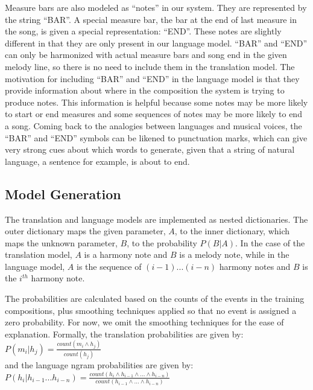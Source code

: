\documentclass{sig-alternate}
\begin{document}
Measure bars are also modeled as ``notes'' in our system. They are represented by the string ``BAR''. A special measure bar, the bar at the end of last measure in the song, is given a special representation: ``END''. These notes are slightly different in that they are only present in our language model. ``BAR'' and ``END'' can only be harmonized with actual measure bars and song end in the given melody line, so there is no need to include them in the translation model. The motivation for including ``BAR'' and ``END'' in the language model is that they provide information about where in the composition the system is trying to produce notes. This information is helpful because some notes may be more likely to start or end measures and some sequences of notes may be more likely to end a song. Coming back to the analogies between languages and musical voices, the ``BAR'' and ``END'' symbols can be likened to punctuation marks, which can give very strong cues about which words to generate, given that a string of natural language, a sentence for example, is about to end.

\subsection{Model Generation}
The translation and language models are implemented as nested dictionaries. The outer dictionary maps the given parameter, $A$, to the inner dictionary, which maps the unknown parameter, $B$, to the probability $P(B | A)$. In the case of the translation model, $A$ is a harmony note and $B$ is a melody note, while in the language model, $A$ is the sequence of $(i - 1) ... (i - n)$ harmony notes and $B$ is the $i^{th}$ harmony note.

The probabilities are calculated based on the counts of the events in the training compositions, plus smoothing techniques applied so that no event is assigned a zero probability. For now, we omit the smoothing techniques for the ease of explanation. Formally, the translation probabilities are given by:\\

$P(m_{i} | h_{j}) = \frac{count(m_{i} \wedge h_{j})}{count(h_{j})}$\\

and the language ngram probabilities are given by: \\

$P(h_{i} | h_{i - 1} ... h_{i - n}) = \frac{count(h_{i} \wedge h_{i - 1} \wedge ... \wedge h_{i - n})}{count(h_{i - 1} \wedge ... \wedge h_{i - n})}$\\
\end{document}
